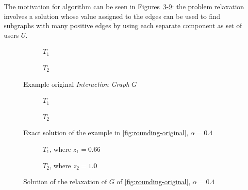 The motivation for algorithm can be seen in
Figures~\ref{fig:rounding-original}-\ref{fig:rounding-relaxed}: the problem
relaxation involves a solution whose value assigned to the edges can be used to
find subgraphs with many positive edges by using each separate component as set
of users $U$.

\begin{figure}
	\begin{center}
		\begin{subfigure}[b]{0.4\textwidth}
			\centering
			\caption{$T_1$}
			\label{fig:rounding-original-t1}
		\end{subfigure}
		\begin{subfigure}[b]{0.4\textwidth}
			\centering
			\caption{$T_2$}
			\label{fig:rounding-original-t2}
		\end{subfigure}
	\end{center}
	\caption{Example original \emph{Interaction Graph} $G$}
	\label{fig:rounding-original}
\end{figure}
\begin{figure}
	\begin{center}
		\begin{subfigure}[b]{0.4\textwidth}
			\centering
			\caption{$T_1$}
			\label{fig:rounding-integer-t1}
		\end{subfigure}
		\begin{subfigure}[b]{0.4\textwidth}
			\centering
			\caption{$T_2$}
			\label{fig:rounding-original-t2}
		\end{subfigure}
	\end{center}
	\caption{Exact solution of the example in \autoref{fig:rounding-original},
		$\alpha = 0.4$}
	\label{fig:rounding-integer}
\end{figure}
\begin{figure}
	\begin{center}
		\begin{subfigure}[b]{0.4\textwidth}
			\centering
			\caption{$T_1$, where $z_1 = 0.66$}
			\label{fig:rounding-relaxed-t1}
		\end{subfigure}
		\begin{subfigure}[b]{0.4\textwidth}
			\centering
			\caption{$T_2$, where $z_2 = 1.0$}
			\label{fig:rounding-relaxed-t2}
		\end{subfigure}
	\end{center}
	\caption{Solution of the relaxation of $G$ of
		\autoref{fig:rounding-original}, $\alpha = 0.4$}
	\label{fig:rounding-relaxed}
\end{figure}

